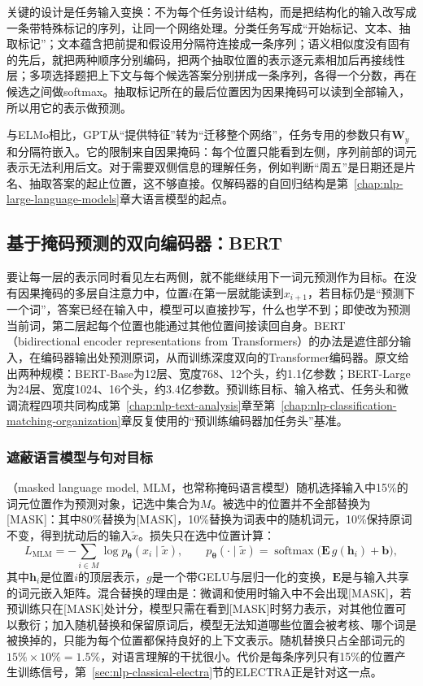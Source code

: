 关键的设计是任务输入变换：不为每个任务设计结构，而是把结构化的输入改写成一条带特殊标记的序列，让同一个网络处理。分类任务写成“开始标记、文本、抽取标记”；文本蕴含把前提和假设用分隔符连接成一条序列；语义相似度没有固有的先后，就把两种顺序分别编码，把两个抽取位置的表示逐元素相加后再接线性层；多项选择题把上下文与每个候选答案分别拼成一条序列，各得一个分数，再在候选之间做softmax。抽取标记所在的最后位置因为因果掩码可以读到全部输入，所以用它的表示做预测。

与ELMo相比，GPT从“提供特征”转为“迁移整个网络”，任务专用的参数只有$\bm W_y$和分隔符嵌入。它的限制来自因果掩码：每个位置只能看到左侧，序列前部的词元表示无法利用后文。对于需要双侧信息的理解任务，例如判断“周五”是日期还是片名、抽取答案的起止位置，这不够直接。仅解码器的自回归结构是第~\ref{chap:nlp-large-language-models}章大语言模型的起点。

\subsection{基于掩码预测的双向编码器：BERT}
\label{sec:nlp-classical-bert}

要让每一层的表示同时看见左右两侧，就不能继续用下一词元预测作为目标。在没有因果掩码的多层自注意力中，位置$i$在第一层就能读到$x_{i+1}$，若目标仍是“预测下一个词”，答案已经在输入中，模型可以直接抄写，什么也学不到；即使改为预测当前词，第二层起每个位置也能通过其他位置间接读回自身。BERT（bidirectional encoder representations from Transformers）的办法是遮住部分输入，在编码器输出处预测原词，从而训练深度双向的Transformer编码器。原文给出两种规模：BERT-Base为12层、宽度768、12个头，约1.1亿参数；BERT-Large为24层、宽度1024、16个头，约3.4亿参数。预训练目标、输入格式、任务头和微调流程四项共同构成第~\ref{chap:nlp-text-analysis}章至第~\ref{chap:nlp-classification-matching-organization}章反复使用的“预训练编码器加任务头”基准。

\subsubsection{遮蔽语言模型与句对目标}
\label{sec:nlp-classical-bert-objectives}

（masked language model, MLM，也常称掩码语言模型）随机选择输入中15\%的词元位置作为预测对象，记选中集合为$M$。被选中的位置并不全部替换为[MASK]：其中80\%替换为[MASK]，10\%替换为词表中的随机词元，10\%保持原词不变，得到扰动后的输入$\tilde x$。损失只在选中位置计算：
\begin{equation}
  L_{\mathrm{MLM}}=-\sum_{i\in M}\log p_{\bm\theta}(x_i\mid\tilde x),\qquad
  p_{\bm\theta}(\cdot\mid\tilde x)=\operatorname{softmax}\bigl(\bm E\,g(\bm h_i)+\bm b\bigr),
  \label{eq:nlp-classical-mlm}
\end{equation}
其中$\bm h_i$是位置$i$的顶层表示，$g$是一个带GELU与层归一化的变换，$\bm E$是与输入共享的词元嵌入矩阵。混合替换的理由是：微调和使用时输入中不会出现[MASK]，若预训练只在[MASK]处计分，模型只需在看到[MASK]时努力表示，对其他位置可以敷衍；加入随机替换和保留原词后，模型无法知道哪些位置会被考核、哪个词是被换掉的，只能为每个位置都保持良好的上下文表示。随机替换只占全部词元的$15\%\times10\%=1.5\%$，对语言理解的干扰很小。代价是每条序列只有15\%的位置产生训练信号，第~\ref{sec:nlp-classical-electra}节的ELECTRA正是针对这一点。

